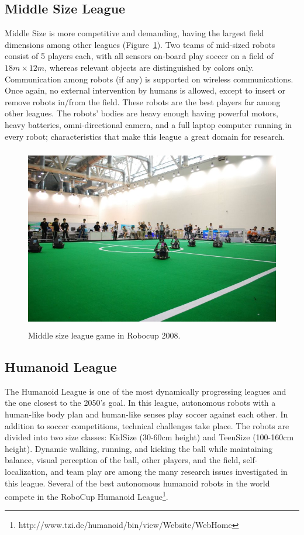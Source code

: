 \subsection{Middle Size League}

Middle Size is more competitive and demanding, having the largest field dimensions among other leagues (Figure~\ref{fig:middleSize}). Two teams of mid-sized robots consist of 5 players each, with all sensors on-board play soccer on a field of $18 m \times 12 m$, whereas relevant objects are distinguished by colors only. Communication among robots (if any) is supported on wireless communications. Once again, no external intervention by humans is allowed, except to insert or remove robots in/from the field. These robots are the best players far among other leagues. The robots' bodies are heavy enough having powerful motors, heavy batteries, omni-directional camera, and a full laptop computer running in every robot; characteristics that make this league a great domain for research.


\begin{figure}[h]
	\begin{center}
		\includegraphics[height = 8cm]{Chapter1/figures/middleSize1.jpg}
		\caption{Middle size league game in Robocup 2008.}
 		\label{fig:middleSize}
	\end{center}
\end{figure}

\subsection{Humanoid League}

The Humanoid League is one of the most dynamically progressing leagues and the one closest to the 2050's goal. In this league, autonomous robots with a human-like body plan and human-like senses play soccer against each other. In addition to soccer competitions, technical challenges take place. The robots are divided into two size classes: KidSize (30-60cm height) and TeenSize (100-160cm height). Dynamic walking, running, and kicking the ball while maintaining balance, visual perception of the ball, other players, and the field, self-localization, and team play are among the many research issues investigated in this league. Several of the best autonomous humanoid robots in the world compete in the RoboCup Humanoid League\footnote{http://www.tzi.de/humanoid/bin/view/Website/WebHome}.